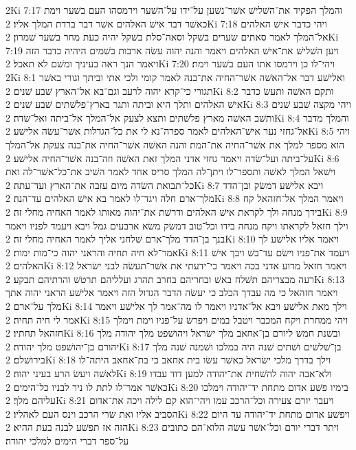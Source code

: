 2Ki 7:17  והמלך הפקיד את־השׁלישׁ אשׁר־נשׁען על־ידו על־השׁער וירמסהו העם בשׁער וימת כאשׁר דבר אישׁ האלהים אשׁר דבר ברדת המלך אליו׃
2Ki 7:18  ויהי כדבר אישׁ האלהים אל־המלך לאמר סאתים שׂערים בשׁקל וסאה־סלת בשׁקל יהיה כעת מחר בשׁער שׁמרון׃
2Ki 7:19  ויען השׁלישׁ את־אישׁ האלהים ויאמר והנה יהוה עשׂה ארבות בשׁמים היהיה כדבר הזה ויאמר הנך ראה בעיניך ומשׁם לא תאכל׃
2Ki 7:20  ויהי־לו כן וירמסו אתו העם בשׁער וימת׃
2Ki 8:1  ואלישׁע דבר אל־האשׁה אשׁר־החיה את־בנה לאמר קומי ולכי אתי וביתך וגורי באשׁר תגורי כי־קרא יהוה לרעב וגם־בא אל־הארץ שׁבע שׁנים׃
2Ki 8:2  ותקם האשׁה ותעשׂ כדבר אישׁ האלהים ותלך היא וביתה ותגר בארץ־פלשׁתים שׁבע שׁנים׃
2Ki 8:3  ויהי מקצה שׁבע שׁנים ותשׁב האשׁה מארץ פלשׁתים ותצא לצעק אל־המלך אל־ביתה ואל־שׂדה׃
2Ki 8:4  והמלך מדבר אל־גחזי נער אישׁ־האלהים לאמר ספרה־נא לי את כל־הגדלות אשׁר־עשׂה אלישׁע׃
2Ki 8:5  ויהי הוא מספר למלך את אשׁר־החיה את־המת והנה האשׁה אשׁר־החיה את־בנה צעקת אל־המלך על־ביתה ועל־שׂדה ויאמר גחזי אדני המלך זאת האשׁה וזה־בנה אשׁר־החיה אלישׁע׃
2Ki 8:6  וישׁאל המלך לאשׁה ותספר־לו ויתן־לה המלך סריס אחד לאמר השׁיב את־כל־אשׁר־לה ואת כל־תבואת השׂדה מיום עזבה את־הארץ ועד־עתה׃
2Ki 8:7  ויבא אלישׁע דמשׂק ובן־הדד מלך־ארם חלה ויגד־לו לאמר בא אישׁ האלהים עד־הנה׃
2Ki 8:8  ויאמר המלך אל־חזהאל קח בידך מנחה ולך לקראת אישׁ האלהים ודרשׁת את־יהוה מאותו לאמר האחיה מחלי זה׃
2Ki 8:9  וילך חזאל לקראתו ויקח מנחה בידו וכל־טוב דמשׂק משׂא ארבעים גמל ויבא ויעמד לפניו ויאמר בנך בן־הדד מלך־ארם שׁלחני אליך לאמר האחיה מחלי זה׃
2Ki 8:10  ויאמר אליו אלישׁע לך אמר־לא חיה תחיה והראני יהוה כי־מות ימות׃
2Ki 8:11  ויעמד את־פניו וישׂם עד־בשׁ ויבך אישׁ האלהים׃
2Ki 8:12  ויאמר חזאל מדוע אדני בכה ויאמר כי־ידעתי את אשׁר־תעשׂה לבני ישׂראל רעה מבצריהם תשׁלח באשׁ ובחריהם בחרב תהרג ועלליהם תרטשׁ והרתיהם תבקע׃
2Ki 8:13  ויאמר חזהאל כי מה עבדך הכלב כי יעשׂה הדבר הגדול הזה ויאמר אלישׁע הראני יהוה אתך מלך על־ארם׃
2Ki 8:14  וילך מאת אלישׁע ויבא אל־אדניו ויאמר לו מה־אמר לך אלישׁע ויאמר אמר לי חיה תחיה׃
2Ki 8:15  ויהי ממחרת ויקח המכבר ויטבל במים ויפרשׂ על־פניו וימת וימלך חזהאל תחתיו׃
2Ki 8:16  ובשׁנת חמשׁ ליורם בן־אחאב מלך ישׂראל ויהושׁפט מלך יהודה מלך יהורם בן־יהושׁפט מלך יהודה׃
2Ki 8:17  בן־שׁלשׁים ושׁתים שׁנה היה במלכו ושׁמנה שׁנה מלך בירושׁלם׃
2Ki 8:18  וילך בדרך מלכי ישׂראל כאשׁר עשׂו בית אחאב כי בת־אחאב היתה־לו לאשׁה ויעשׂ הרע בעיני יהוה׃
2Ki 8:19  ולא־אבה יהוה להשׁחית את־יהודה למען דוד עבדו כאשׁר אמר־לו לתת לו ניר לבניו כל־הימים׃
2Ki 8:20  בימיו פשׁע אדום מתחת יד־יהודה וימלכו עליהם מלך׃
2Ki 8:21  ויעבר יורם צעירה וכל־הרכב עמו ויהי־הוא קם לילה ויכה את־אדום הסביב אליו ואת שׂרי הרכב וינס העם לאהליו׃
2Ki 8:22  ויפשׁע אדום מתחת יד־יהודה עד היום הזה אז תפשׁע לבנה בעת ההיא׃
2Ki 8:23  ויתר דברי יורם וכל־אשׁר עשׂה הלוא־הם כתובים על־ספר דברי הימים למלכי יהודה׃
